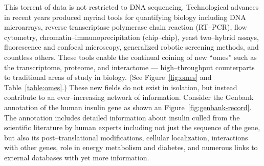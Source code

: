 This torrent of data is not restricted to DNA sequencing.
Technological advances in recent years produced myriad tools
for quantifying biology including DNA microarrays, reverse
transcriptase polymerase chain reaction (RT--PCR), flow cytometry,
chromatin--immunoprecipitation (chip--chip), yeast two--hybrid
assays, fluorescence and confocal microscopy, generalized robotic
screening methods, and countless others.  These tools enable the
continual coining of new ``omes'' such as the transcriptome,
proteome, and interactome --- high--throughput counterparts to
traditional areas of study in biology.  (See Figure~\vref{fig:omes}
and Table~\vref{table:omes}.)  These new fields do not exist in
isolation, but instead contribute to an ever--increasing network of
information.  Consider the Genbank annotation of the human insulin
gene as shown an Figure~\vref{fig:genbank-record}. The annotation
includes detailed information about insulin culled from the
scientific literature by human experts including not just the
sequence of the gene, but also its post--translational
modifications, cellular localization, interactions with other genes,
role in energy metabolism and diabetes, and numerous links to
external databases with yet more information.

